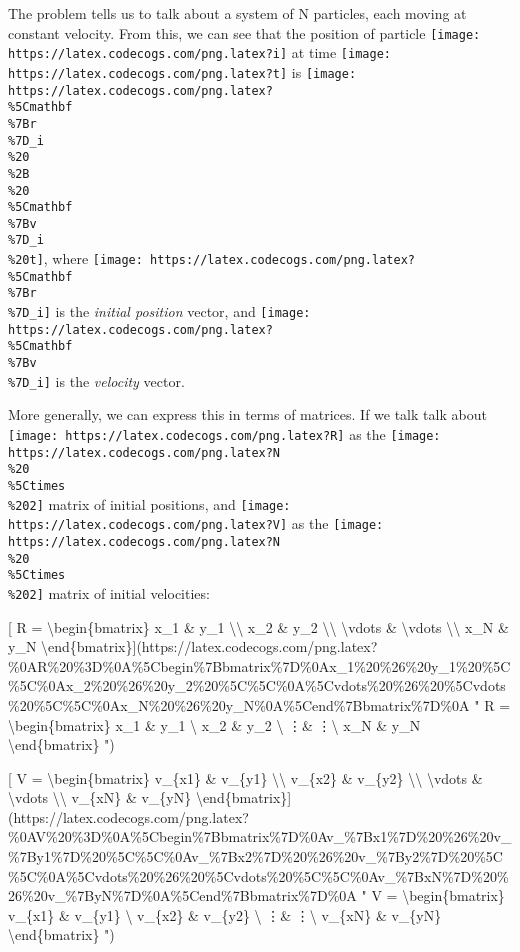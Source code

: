 \documentclass[]{article}
\begin{document}
The problem tells us to talk about a system of N particles, each moving at
constant velocity. From this, we can see that the position of particle
\texttt{[image: https://latex.codecogs.com/png.latex?i]} at time
\texttt{[image: https://latex.codecogs.com/png.latex?t]} is
\texttt{[image: https://latex.codecogs.com/png.latex?\\\%5Cmathbf\\\%7Br\\\%7D\_i\\\%20\\\%2B\\\%20\\\%5Cmathbf\\\%7Bv\\\%7D\_i\\\%20t]},
where
\texttt{[image: https://latex.codecogs.com/png.latex?\\\%5Cmathbf\\\%7Br\\\%7D\_i]} is
the \emph{initial position} vector, and
\texttt{[image: https://latex.codecogs.com/png.latex?\\\%5Cmathbf\\\%7Bv\\\%7D\_i]} is
the \emph{velocity} vector.

More generally, we can express this in terms of matrices. If we talk talk about
\texttt{[image: https://latex.codecogs.com/png.latex?R]} as the
\texttt{[image: https://latex.codecogs.com/png.latex?N\\\%20\\\%5Ctimes\\\%202]}
matrix of initial positions, and
\texttt{[image: https://latex.codecogs.com/png.latex?V]} as the
\texttt{[image: https://latex.codecogs.com/png.latex?N\\\%20\\\%5Ctimes\\\%202]}
matrix of initial velocities:

{[} R = \textbackslash{}begin\{bmatrix\} x\_1 \& y\_1
\textbackslash{}\textbackslash{} x\_2 \& y\_2 \textbackslash{}\textbackslash{}
\textbackslash{}vdots \& \textbackslash{}vdots \textbackslash{}\textbackslash{}
x\_N \& y\_N
\textbackslash{}end\{bmatrix\}{]}(https://latex.codecogs.com/png.latex?\%0AR\%20\%3D\%0A\%5Cbegin\%7Bbmatrix\%7D\%0Ax\_1\%20\%26\%20y\_1\%20\%5C\%5C\%0Ax\_2\%20\%26\%20y\_2\%20\%5C\%5C\%0A\%5Cvdots\%20\%26\%20\%5Cvdots\%20\%5C\%5C\%0Ax\_N\%20\%26\%20y\_N\%0A\%5Cend\%7Bbmatrix\%7D\%0A
" R = \textbackslash{}begin\{bmatrix\} x\_1 \& y\_1 \textbackslash{} x\_2 \&
y\_2 \textbackslash{} \vdots \& \vdots \textbackslash{} x\_N \& y\_N
\textbackslash{}end\{bmatrix\} ")

{[} V = \textbackslash{}begin\{bmatrix\} v\_\{x1\} \& v\_\{y1\}
\textbackslash{}\textbackslash{} v\_\{x2\} \& v\_\{y2\}
\textbackslash{}\textbackslash{} \textbackslash{}vdots \& \textbackslash{}vdots
\textbackslash{}\textbackslash{} v\_\{xN\} \& v\_\{yN\}
\textbackslash{}end\{bmatrix\}{]}(https://latex.codecogs.com/png.latex?\%0AV\%20\%3D\%0A\%5Cbegin\%7Bbmatrix\%7D\%0Av\_\%7Bx1\%7D\%20\%26\%20v\_\%7By1\%7D\%20\%5C\%5C\%0Av\_\%7Bx2\%7D\%20\%26\%20v\_\%7By2\%7D\%20\%5C\%5C\%0A\%5Cvdots\%20\%26\%20\%5Cvdots\%20\%5C\%5C\%0Av\_\%7BxN\%7D\%20\%26\%20v\_\%7ByN\%7D\%0A\%5Cend\%7Bbmatrix\%7D\%0A
" V = \textbackslash{}begin\{bmatrix\} v\_\{x1\} \& v\_\{y1\} \textbackslash{}
v\_\{x2\} \& v\_\{y2\} \textbackslash{} \vdots \& \vdots \textbackslash{}
v\_\{xN\} \& v\_\{yN\} \textbackslash{}end\{bmatrix\} ")
\end{document}
